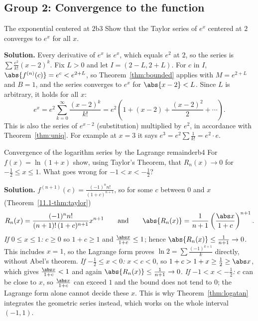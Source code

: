 \documentclass[11pt]{article}
\begin{document}
\subsection*{Group 2: Convergence to the function}

\begin{exmp}{The exponential centered at $2$}{b3}
Show that the Taylor series of $e^x$ centered at $2$ converges to $e^x$ for all $x$.

\textbf{Solution.} Every derivative of $e^x$ is $e^x$, which equals $e^2$ at $2$, so the series is $\sum\frac{e^2}{k!}(x-2)^k$. Fix $L>0$ and let $I=(2-L,2+L)$. For $c$ in $I$, $\abs{f^{(n)}(c)}=e^c<e^{2+L}$, so Theorem~\ref{thm:bounded} applies with $M=e^{2+L}$ and $B=1$, and the series converges to $e^x$ for $\abs{x-2}<L$. Since $L$ is arbitrary, it holds for all $x$:
\[
e^x=e^2\sum_{k=0}^\infty\frac{(x-2)^k}{k!}=e^2\left(1+(x-2)+\frac{(x-2)^2}2+\cdots\right).
\]
This is also the series of $e^{x-2}$ (substitution) multiplied by $e^2$, in accordance with Theorem~\ref{thm:uniq}. For example at $x=3$ it says $e^3=e^2\sum\frac1{k!}=e^2\cdot e$.
\end{exmp}

\begin{exmp}{Convergence of the logarithm series by the Lagrange remainder}{b4}
For $f(x)=\ln(1+x)$ show, using Taylor's Theorem, that $R_n(x)\to0$ for $-\frac12\le x\le1$. What goes wrong for $-1<x<-\frac12$?

\textbf{Solution.} $f^{(n+1)}(c)=\frac{(-1)^nn!}{(1+c)^{n+1}}$, so for some $c$ between $0$ and $x$ (Theorem~\ref{11.1-thm:taylor})
\[
R_n(x)=\frac{(-1)^nn!}{(n+1)!\,(1+c)^{n+1}}x^{n+1}\qquad\text{and}\qquad\abs{R_n(x)}=\frac1{n+1}\left(\frac{\abs x}{1+c}\right)^{n+1}.
\]
\emph{If $0\le x\le1$:} $c\ge0$ so $1+c\ge1$ and $\frac{\abs x}{1+c}\le1$; hence $\abs{R_n(x)}\le\frac1{n+1}\to0$. This includes $x=1$, so the Lagrange form proves $\ln2=\sum\frac{(-1)^{k+1}}k$ directly, without Abel's theorem. \emph{If $-\frac12\le x<0$:} $x<c<0$, so $1+c>1+x\ge\frac12\ge\abs x$, which gives $\frac{\abs x}{1+c}<1$ and again $\abs{R_n(x)}\le\frac1{n+1}\to0$. \emph{If $-1<x<-\frac12$:} $c$ can be close to $x$, so $\frac{\abs x}{1+c}$ can exceed $1$ and the bound does not tend to $0$; the Lagrange form alone cannot decide these $x$. This is why Theorem~\ref{thm:logatan} integrates the geometric series instead, which works on the whole interval $(-1,1)$.
\end{exmp}
\end{document}
